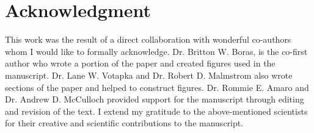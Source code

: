 \documentclass[12pt]{ucsddissertation}
\begin{document}

\section{Acknowledgment}
This work was the result of a direct collaboration with wonderful co-authors whom I would like to formally acknowledge. Dr. Britton W. Boras, is the co-first author who wrote a portion of the paper and created figures used in the manuscript. Dr. Lane W. Votapka and Dr. Robert D. Malmstrom also wrote sections of the paper and helped to construct figures. Dr. Rommie E. Amaro and Dr. Andrew D. McCulloch provided support for the manuscript through editing and revision of the text. I extend my gratitude to the above-mentioned scientists for their creative and scientific contributions to the manuscript. 



\end{document}
